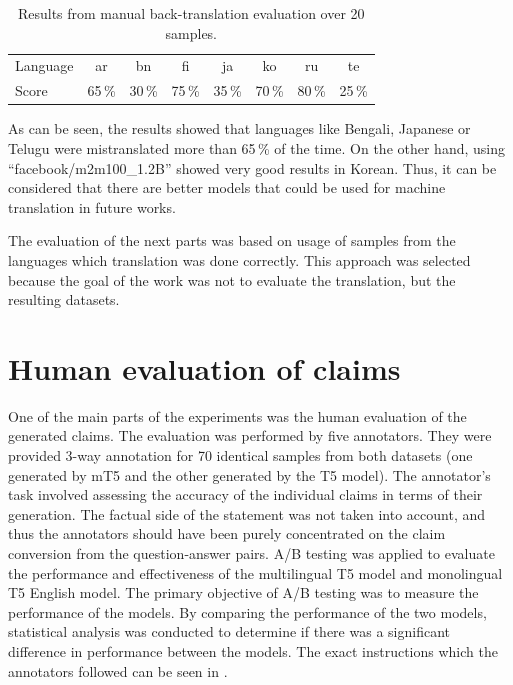 \begin{table}[H]
    \centering
    \begin{tabular}{l|ccccccc}
        \hline
        Language & ar & bn & fi & ja & ko & ru & te \\
        Score & 65\,\% & 30\,\% & 75\,\% & 35\,\% & 70\,\% & 80\,\% & 25\,\% \\
        \hline
    \end{tabular}
    \caption{Results from manual back-translation evaluation over 20 samples.}
    \label{tab:translation_procentage}
\end{table}
As can be seen, the results showed that languages like Bengali, Japanese or Telugu were mistranslated more than 65\,\% of the time. On the other hand, using ``facebook/m2m100\_1.2B'' showed very good results in Korean. Thus, it can be considered that there are better models that could be used for machine translation in future works.

The evaluation of the next parts was based on usage of samples from the languages which translation was done correctly. This approach was selected because the goal of the work was not to evaluate the translation, but the resulting datasets.

\section{Human evaluation of claims}\label{sec:human_evaluation}
One of the main parts of the experiments was the human evaluation of the generated claims. The evaluation was performed by five annotators. They were provided 3-way annotation for 70 identical samples from both datasets (one generated by mT5 and the other generated by the T5 model). The annotator's task involved assessing the accuracy of the individual claims in terms of their generation. The factual side of the statement was not taken into account, and thus the annotators should have been purely concentrated on the claim conversion from the question-answer pairs. A/B testing was applied to evaluate the performance and effectiveness of the multilingual T5 model and monolingual T5 English model. The primary objective of A/B testing was to measure the performance of the models. By comparing the performance of the two models, statistical analysis was conducted to determine if there was a significant difference in performance between the models. The exact instructions which the annotators followed can be seen in {\hypersetup{hidelinks}}.


